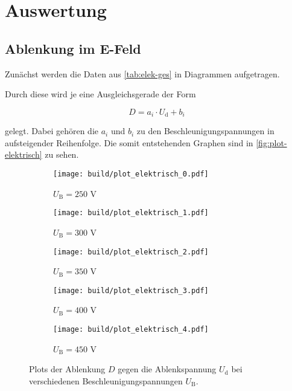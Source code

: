 \section{Auswertung}
\label{sec:Auswertung}

\subsection{Ablenkung im E-Feld}

Zunächst werden die Daten aus \autoref{tab:elek-ges} in Diagrammen aufgetragen.



Durch diese wird je eine Ausgleichsgerade der Form 

\begin{equation}
  D = a_i \cdot U_\text{d} + b_i
\end{equation}

gelegt. Dabei gehören die $a_i$ und $b_i$ zu den Beschleunigungspannungen in aufsteigender Reihenfolge.
Die somit entstehenden Graphen sind in \autoref{fig:plot-elektrisch} zu sehen.

\begin{figure}
  \centering
  \begin{subfigure}{0.49\textwidth}
    \centering
    \texttt{[image: build/plot\_elektrisch\_0.pdf]}
    \caption{$U_\text{B} = 250$ V}
  \end{subfigure}
  \begin{subfigure}{0.49\textwidth}
    \centering
    \texttt{[image: build/plot\_elektrisch\_1.pdf]}
    \caption{$U_\text{B} = 300$ V}
  \end{subfigure}

  \begin{subfigure}{0.49\textwidth}
    \centering
    \texttt{[image: build/plot\_elektrisch\_2.pdf]}
    \caption{$U_\text{B} = 350$ V}
  \end{subfigure}
  \begin{subfigure}{0.49\textwidth}
    \centering
    \texttt{[image: build/plot\_elektrisch\_3.pdf]}
    \caption{$U_\text{B} = 400$ V}
  \end{subfigure}

  \begin{subfigure}{0.49\textwidth}
    \centering
    \texttt{[image: build/plot\_elektrisch\_4.pdf]}
    \caption{$U_\text{B} = 450$ V}
  \end{subfigure}
  \caption{Plots der Ablenkung $D$ gegen die Ablenkspannung $U_\text{d}$ bei verschiedenen Beschleunigungspannungen $U_\text{B}$.}
  \label{fig:plot-elektrisch}
\end{figure}

